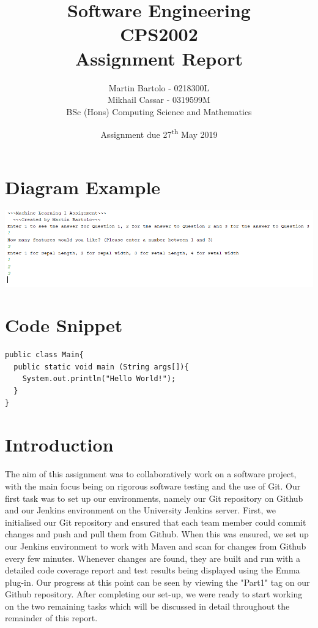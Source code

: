 \documentclass[a4paper,12pt]{extarticle}
\title{\textbf{Software Engineering\\\vspace{5mm} CPS2002\\\vspace{5mm}  Assignment Report}}
\author{\LARGE Martin Bartolo - 0218300L\vspace{1mm}\\ \LARGE Mikhail Cassar - 0319599M\vspace{3mm}\\ \large BSc (Hons) Computing Science and Mathematics}
\date{Assignment due 27\textsuperscript{th} May 2019}
\begin{document}
\setlength{\parindent}{10pt}
\setlength{\footskip}{50pt}

\maketitle
\thispagestyle{empty}
\newpage

\tableofcontents
\newpage

\section{Diagram Example}
\begin{center}
\includegraphics[width=\textwidth]{FigureExample.png}
\end{center}

\section{Code Snippet}
\begin{lstlisting}
public class Main{
  public static void main (String args[]){
    System.out.println("Hello World!");
  }
}
\end{lstlisting}

\section{Introduction}
The aim of this assignment was to collaboratively work on a software project, with the main focus being on rigorous software testing and the use of Git. Our first task was to set up our environments, namely our Git repository on Github and our Jenkins environment on the University Jenkins server. First, we initialised our Git repository and ensured that each team member could commit changes and push and pull them from Github. When this was ensured, we set up our Jenkins environment to work with Maven and scan for changes from Github every few minutes. Whenever changes are found, they are built and run with a detailed code coverage report and test results being displayed using the Emma plug-in. Our progress at this point can be seen by viewing the "Part1" tag on our Github repository. After completing our set-up, we were ready to start working on the two remaining tasks which will be discussed in detail throughout the remainder of this report.
\newpage
\end{document}
